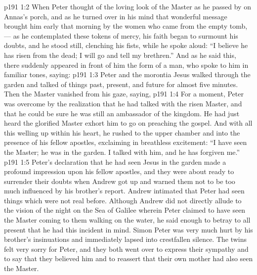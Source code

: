 \vs p191 1:2 When Peter thought of the loving look of the Master as he passed by on Annas’s porch, and as he turned over in his mind that wonderful message brought him early that morning by the women who came from the empty tomb,  --- as he contemplated these tokens of mercy, his faith began to surmount his doubts, and he stood still, clenching his fists, while he spoke aloud: “I believe he has risen from the dead; I will go and tell my brethren.” And as he said this, there suddenly appeared in front of him the form of a man, who spoke to him in familiar tones, saying: 
\vs p191 1:3 Peter and the morontia Jesus walked through the garden and talked of things past, present, and future for almost five minutes. Then the Master vanished from his gaze, saying, 
\vs p191 1:4 For a moment, Peter was overcome by the realization that he had talked with the risen Master, and that he could be sure he was still an ambassador of the kingdom. He had just heard the glorified Master exhort him to go on preaching the gospel. And with all this welling up within his heart, he rushed to the upper chamber and into the presence of his fellow apostles, exclaiming in breathless excitement: “I have seen the Master; he was in the garden. I talked with him, and he has forgiven me.”
\vs p191 1:5 Peter’s declaration that he had seen Jesus in the garden made a profound impression upon his fellow apostles, and they were about ready to surrender their doubts when Andrew got up and warned them not to be too much influenced by his brother’s report. Andrew intimated that Peter had seen things which were not real before. Although Andrew did not directly allude to the vision of the night on the Sea of Galilee wherein Peter claimed to have seen the Master coming to them walking on the water, he said enough to betray to all present that he had this incident in mind. Simon Peter was very much hurt by his brother’s insinuations and immediately lapsed into crestfallen silence. The twins felt very sorry for Peter, and they both went over to express their sympathy and to say that they believed him and to reassert that their own mother had also seen the Master.
